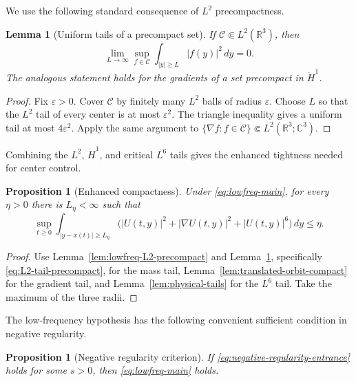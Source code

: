 \documentclass[preprint,12pt]{elsarticle}
\numberwithin{equation}{section}
\newtheorem{proposition}[theorem]{Proposition}
\newtheorem{lemma}[theorem]{Lemma}
\theoremstyle{remark}
\newcommand{\R}{\mathbb R}
\newcommand{\C}{\mathbb C}
\newcommand{\dd}{\,d}
\begin{document}
We use the following standard consequence of $L^2$ precompactness.

\begin{lemma}[Uniform tails of a precompact set]\label{lem:L2-compact-tail}
If $\mathcal C\Subset L^2(\R^3)$, then
\begin{equation}\label{eq:L2-tail-precompact}
  \lim_{L\to\infty}\sup_{f\in\mathcal C}
  \int_{|y|\ge L}|f(y)|^2\dd y=0.
\end{equation}
The analogous statement holds for the gradients of a set precompact in $\dot H^1$.
\end{lemma}

\begin{proof}
Fix $\varepsilon>0$. Cover $\mathcal C$ by finitely many $L^2$ balls of radius $\varepsilon$. Choose $L$ so that the $L^2$ tail of every center is at most $\varepsilon^2$. The triangle inequality gives a uniform tail at most $4\varepsilon^2$. Apply the same argument to $\{\nabla f:f\in\mathcal C\}\Subset L^2(\R^3;\C^3)$.
\end{proof}

Combining the $L^2$, $\dot H^1$, and critical $L^6$ tails gives the enhanced tightness needed for center control.

\begin{proposition}[Enhanced compactness]\label{prop:enhanced-compactness}
Under \eqref{eq:lowfreq-main}, for every $\eta>0$ there is $L_\eta<\infty$ such that
\begin{equation}\label{eq:enhanced-tightness}
  \sup_{t\ge0}
  \int_{|y-x(t)|\ge L_\eta}
  \bigl(|U(t,y)|^2+|\nabla U(t,y)|^2+|U(t,y)|^6\bigr)\dd y
  \le\eta.
\end{equation}
\end{proposition}

\begin{proof}
Use Lemma~\ref{lem:lowfreq-L2-precompact} and Lemma~\ref{lem:L2-compact-tail}, specifically \eqref{eq:L2-tail-precompact}, for the mass tail, Lemma~\ref{lem:translated-orbit-compact} for the gradient tail, and Lemma~\ref{lem:physical-tails} for the $L^6$ tail. Take the maximum of the three radii.
\end{proof}

The low-frequency hypothesis has the following convenient sufficient condition in negative regularity.

\begin{proposition}[Negative regularity criterion]\label{prop:negative-regularity-entrance}
If \eqref{eq:negative-regularity-entrance} holds for some $s>0$, then \eqref{eq:lowfreq-main} holds.
\end{proposition}
\end{document}
